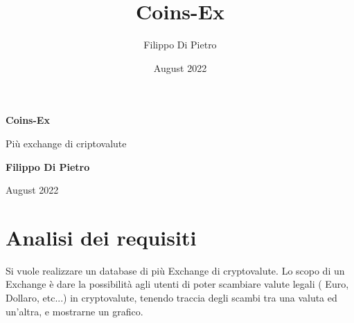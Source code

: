 \documentclass{article}
\title{Coins-Ex}
\author{Filippo Di Pietro}
\date{August 2022}
\begin{document}
\begin{titlepage}
    \begin{center}
        \vspace*{1cm}
            
        \Huge
        \textbf{Coins-Ex}
            
        \vspace{0.5cm}
        \LARGE
        Più exchange di criptovalute
            
        \vspace{1.5cm}
            
        \textbf{Filippo Di Pietro}
            
        \vfill
        August 2022
            
    \end{center}
\end{titlepage}
\newpage
{}
\section{Analisi dei requisiti}
Si vuole realizzare un database di più Exchange di cryptovalute.
Lo scopo di un Exchange è dare la possibilità agli utenti di poter scambiare valute legali ( Euro, Dollaro, etc...) in cryptovalute, tenendo traccia degli scambi tra una valuta ed un’altra, e mostrarne un grafico.
\end{document}
